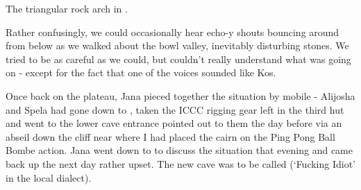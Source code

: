 \begin{marginfigure}
      \checkoddpage \ifoddpage \forcerectofloat \else \forceversofloat \fi
      \centering
  \caption{The triangular rock arch in . }
\end{marginfigure}

Rather confusingly, we could occasionally hear echo-y shouts bouncing
around from below as we walked about the bowl valley, inevitably
disturbing stones. We tried to be as careful as we could, but couldn't
really understand what was going on - except for the fact that one of
the voices sounded like Kos.

Once back on the plateau, Jana pieced together the situation by mobile -
Alijosha and Spela had gone down to , taken the ICCC rigging gear
left in the third hut and went to the lower cave entrance pointed out to
them the day before via an abseil down the cliff near 
where I had placed the cairn on the Ping Pong Ball Bombe action. Jana
went down to  to discuss the situation that evening and came back up
the next day rather upset. The new cave was to be called 
(`Fucking Idiot' in the local dialect).


